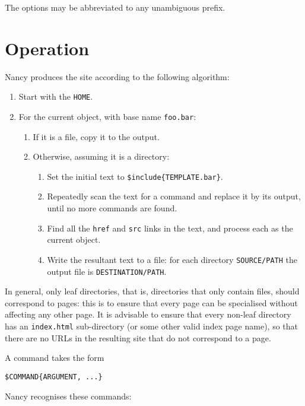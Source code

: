 \documentclass[english]{scrartcl}
\begin{document}
The options may be abbreviated to any unambiguous prefix.

\section{Operation}
\label{operation}

Nancy produces the site according to the following algorithm:

\begin{enumerate}
\item Start with the \verb|HOME|.
\item For the current object, with base name \verb|foo.bar|:
\begin{enumerate}
\item If it is a file, copy it to the output.
\item Otherwise, assuming it is a directory:
\begin{enumerate}
\item Set the initial text to \verb|$include{TEMPLATE.bar}|.
\item Repeatedly scan the text for a command and replace it by its output, until no more commands are found.
\item Find all the \verb|href| and \verb|src| links in the text, and process each as the current object.
\item Write the resultant text to a file: for each directory \verb|SOURCE/PATH| the output file is \verb|DESTINATION/PATH|.
\end{enumerate}
\end{enumerate}
\end{enumerate}

In general, only leaf directories, that is, directories that only contain files, should correspond to pages: this is to ensure that every page can be specialised without affecting any other page. It is advisable to ensure that every non-leaf directory has an \verb|index.html| sub-directory (or some other valid index page name), so that there are no URLs in the resulting site that do not correspond to a page.

A command takes the form

\begin{verbatim}
$COMMAND{ARGUMENT, ...}
\end{verbatim}

Nancy recognises these commands:
\end{document}

